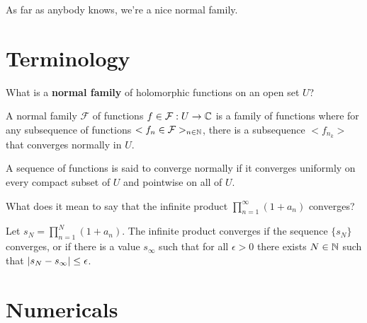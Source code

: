\documentclass{homework}
\author{Alex Li}
\begin{document}
\maketitle

\begin{inspiration} %
  As far as anybody knows, we're a nice normal family.
  \end{inspiration}

  \section{Terminology}

  \begin{problem}
    What is a \textbf{normal family} of holomorphic functions on an open set $U$?
    \end{problem}
    \begin{solution}
    A normal family $\mathcal{F}$ of functions $f\in \mathcal{F}: U \to \mathbb{C}$ is a family of functions where for any subsequence of functions $<f_n\in\mathcal{F}>_{n\in \mathbb{N}}$, there is a subsequence $<f_{n_k}>$ that converges normally in $U$.

    A sequence of functions is said to converge normally if it converges uniformly on every compact subset of $U$ and pointwise on all of $U$.

    \end{solution}
    \begin{problem}
      What does it mean to say that the infinite product
        \(
            \prod_{n=1}^\infty \left( 1 + a_n \right)
              \)
                converges?
                \end{problem}
                \begin{solution}
                Let $s_N = \prod_{n=1}^N \left(1 + a_n\right).$ The infinite product converges if the sequence $\{s_N\}$ converges, or if there is a value $s_\infty$ such that for all $\epsilon> 0$ there exists $N\in \mathbb{N}$ such that $\left|s_N - s_\infty\right| \leq \epsilon$.

                \end{solution}
                \section{Numericals}
\end{document}
